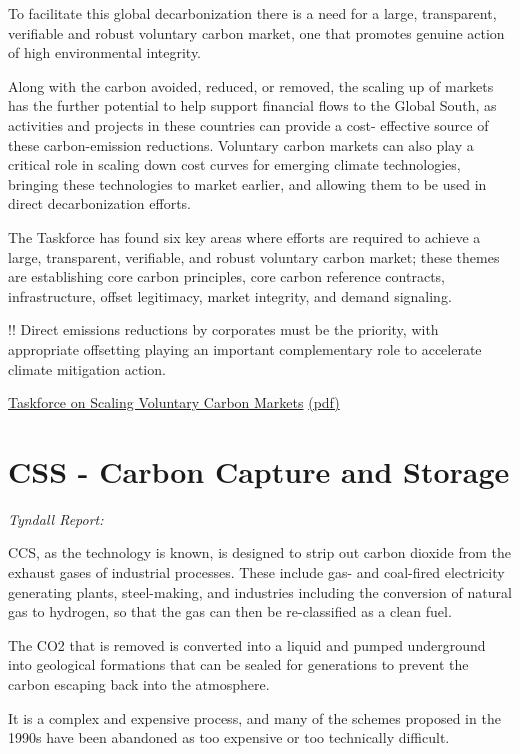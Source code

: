 \documentclass[
]{book}
\begin{document}
To facilitate this global
decarbonization there is a need for a large,
transparent, verifiable and robust voluntary
carbon market, one that promotes genuine
action of high environmental integrity.

Along with the carbon avoided, reduced, or
removed, the scaling up of markets has the
further potential to help support financial
flows to the Global South, as activities and
projects in these countries can provide a cost-
effective source of these carbon-emission
reductions. Voluntary carbon markets can
also play a critical role in scaling down cost
curves for emerging climate technologies,
bringing these technologies to market earlier,
and allowing them to be used in direct
decarbonization efforts.

The Taskforce has found
six key areas where efforts are required
to achieve a large, transparent, verifiable,
and robust voluntary carbon market;
these themes are establishing core carbon
principles, core carbon reference contracts,
infrastructure, offset legitimacy, market
integrity, and demand signaling.

!! Direct
emissions reductions by corporates must
be the priority, with appropriate offsetting
playing an important complementary role
to accelerate climate mitigation action.

\href{https://www.iif.com/tsvcm}{Taskforce on Scaling Voluntary Carbon Markets}
\href{pdf/TSVCM_2021_Scaling_Carbon_Markets.pdf}{(pdf)}

\hypertarget{css---carbon-capture-and-storage}{%
\chapter{CSS - Carbon Capture and Storage}\label{css---carbon-capture-and-storage}}

\emph{Tyndall Report:}

CCS, as the technology is known, is designed to
strip out carbon dioxide from the exhaust gases of industrial processes.
These include gas- and coal-fired electricity generating plants, steel-making,
and industries including the conversion of natural gas to hydrogen,
so that the gas can then be re-classified as a clean fuel.

The CO2 that is removed is converted into a liquid and pumped underground
into geological formations that can be sealed for generations
to prevent the carbon escaping back into the atmosphere.

It is a complex and expensive process, and many of the schemes proposed in the 1990s
have been abandoned as too expensive or too technically difficult.
\end{document}

